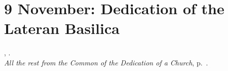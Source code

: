 {
  \section{9 November: Dedication of the Lateran Basilica}
  {\noindent\deusinadjutorium{}, \printhymnsundayrefnospace{}.\\
  \emph{All the rest from the Common of the Dedication of a Church}, p.~\pageref{commondedicationofchurch}.}
}